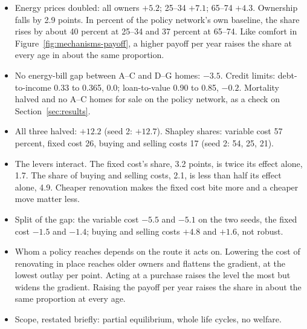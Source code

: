 \begin{itemize}
  \item {} Energy prices doubled: all owners $+5.2$; 25--34
    $+7.1$; 65--74 $+4.3$. Ownership falls by 2.9 points. In percent of the
    policy network's own baseline, the share rises by about 40 percent at
    25--34 and 37 percent at 65--74. Like comfort in
    Figure~\ref{fig:mechanisms-payoff}, a higher payoff per year raises the
    share at every age in about the same proportion.
  \item {} No energy-bill gap between
    A--C and D--G homes: $-3.5$. Credit limits: debt-to-income
    0.33 to 0.365, 0.0; loan-to-value 0.90 to 0.85, $-0.2$. Mortality halved
    and no A--C homes for sale on the policy network, as a check on
    Section~\ref{sec:results}.
\end{itemize}

\begin{itemize}
  \item {} All three halved: $+12.2$ (seed 2: $+12.7$).
    Shapley shares: variable cost 57 percent, fixed cost 26, buying and
    selling costs 17 (seed 2: 54, 25, 21).
  \item {} The levers interact. The fixed cost's share, 3.2
    points, is twice its effect alone, 1.7. The share of buying and selling
    costs, 2.1, is less than half its effect alone, 4.9. Cheaper renovation
    makes the fixed cost bite more and a cheaper move matter less.
  \item {} Split of the gap: the variable cost $-5.5$ and
    $-5.1$ on the two seeds, the fixed cost $-1.5$ and $-1.4$; buying and
    selling costs $+4.8$ and $+1.6$, not robust.
\end{itemize}
\fi

\begin{itemize}
  \item {} Whom a policy reaches depends on the route it acts on.
    Lowering the cost of renovating in place reaches older owners and
    flattens the gradient, at the lowest outlay per point. Acting at a
    purchase raises the level the most but widens the gradient. Raising the
    payoff per year raises the share in about the same proportion at every
    age.
  \item {} Scope, restated briefly: partial equilibrium, whole life
    cycles, no welfare.
\end{itemize}

